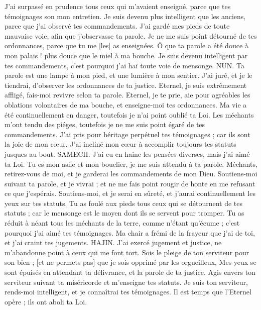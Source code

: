\begin{multicols}{2}
J'ai surpassé en prudence tous ceux qui m'avaient enseigné, parce que tes témoignages son mon entretien.
Je suis devenu plus intelligent que les anciens, parce que j'ai observé tes commandements.
J'ai gardé mes pieds de toute mauvaise voie, afin que j'observasse ta parole.
Je ne me suis point détourné de tes ordonnances, parce que tu me [les] as enseignées.
Ô que ta parole a été douce à mon palais ! plus douce que le miel à ma bouche.
Je suis devenu intelligent par tes commandements, c'est pourquoi j'ai haï toute voie de mensonge.
NUN. Ta parole est une lampe à mon pied, et une lumière à mon sentier.
J'ai juré, et je le tiendrai, d'observer les ordonnances de ta justice.
Eternel, je suis extrêmement affligé, fais-moi revivre selon ta parole.
Eternel, je te prie, aie pour agréables les oblations volontaires de ma bouche, et enseigne-moi tes ordonnances.
Ma vie a été continuellement en danger, toutefois je n'ai point oublié ta Loi.
Les méchants m'ont tendu des piéges, toutefois je ne me suis point égaré de tes commandements.
J'ai pris pour héritage perpétuel tes témoignages ; car ils sont la joie de mon cœur.
J'ai incliné mon cœur à accomplir toujours tes statuts jusques au bout.
SAMECH. J'ai eu en haine les pensées diverses, mais j'ai aimé ta Loi.
Tu es mon asile et mon bouclier, je me suis attendu à ta parole.
Méchants, retirez-vous de moi, et je garderai les commandements de mon Dieu.
Soutiens-moi suivant ta parole, et je vivrai ; et ne me fais point rougir de honte en me refusant ce que j'espérais.
Soutiens-moi, et je serai en sûreté, et j'aurai continuellement les yeux sur tes statuts.
Tu as foulé aux pieds tous ceux qui se détournent de tes statuts ; car le mensonge est le moyen dont ils se servent pour tromper.
Tu as réduit à néant tous les méchants de la terre, comme n'étant qu'écume ; c'est pourquoi j'ai aimé tes témoignages.
Ma chair a frémi de la frayeur que j'ai de toi, et j'ai craint tes jugements.
HAJIN. J'ai exercé jugement et justice, ne m'abandonne point à ceux qui me font tort.
Sois le pleige de ton serviteur pour son bien ; [et ne permets pas] que je sois opprimé par les orgueilleux,
Mes yeux se sont épuisés en attendant ta délivrance, et la parole de ta justice.
Agis envers ton serviteur suivant ta miséricorde et m'enseigne tes statuts.
Je suis ton serviteur, rends-moi intelligent, et je connaîtrai tes témoignages.
Il est temps que l'Eternel opère ; ils ont aboli ta Loi.

\end{multicols}
